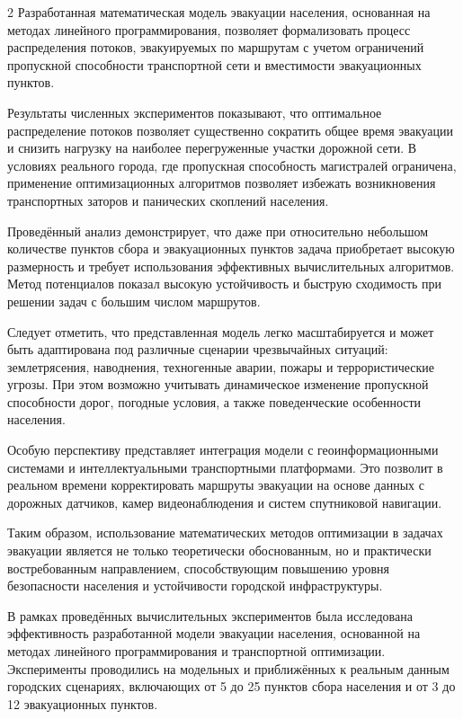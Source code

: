 \begin{multicols}{2}
Разработанная математическая модель эвакуации населения, основанная на
методах линейного программирования, позволяет формализовать процесс
распределения потоков, эвакуируемых по маршрутам с учетом ограничений
пропускной способности транспортной сети и вместимости эвакуационных
пунктов.

Результаты численных экспериментов показывают, что оптимальное
распределение потоков позволяет существенно сократить общее время
эвакуации и снизить нагрузку на наиболее перегруженные участки дорожной
сети. В условиях реального города, где пропускная способность
магистралей ограничена, применение оптимизационных алгоритмов позволяет
избежать возникновения транспортных заторов и панических скоплений
населения.

Проведённый анализ демонстрирует, что даже при относительно небольшом
количестве пунктов сбора и эвакуационных пунктов задача приобретает
высокую размерность и требует использования эффективных вычислительных
алгоритмов. Метод потенциалов показал высокую устойчивость и быструю
сходимость при решении задач с большим числом маршрутов.

Следует отметить, что представленная модель легко масштабируется и может
быть адаптирована под различные сценарии чрезвычайных ситуаций:
землетрясения, наводнения, техногенные аварии, пожары и террористические
угрозы. При этом возможно учитывать динамическое изменение пропускной
способности дорог, погодные условия, а также поведенческие особенности
населения.

Особую перспективу представляет интеграция модели с геоинформационными
системами и интеллектуальными транспортными платформами. Это позволит в
реальном времени корректировать маршруты эвакуации на основе данных с
дорожных датчиков, камер видеонаблюдения и систем спутниковой навигации.

Таким образом, использование математических методов оптимизации в
задачах эвакуации является не только теоретически обоснованным, но и
практически востребованным направлением, способствующим повышению уровня
безопасности населения и устойчивости городской инфраструктуры.

В рамках проведённых вычислительных экспериментов была исследована
эффективность разработанной модели эвакуации населения, основанной на
методах линейного программирования и транспортной оптимизации.
Эксперименты проводились на модельных и приближённых к реальным данным
городских сценариях, включающих от 5 до 25 пунктов сбора населения и от
3 до 12 эвакуационных пунктов.


\end{multicols}
